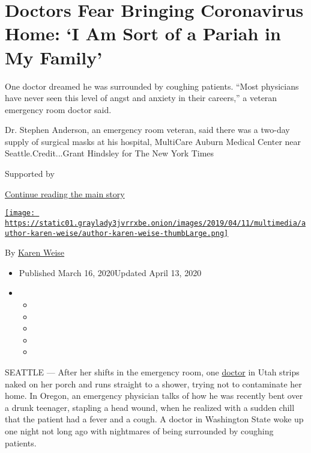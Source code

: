 \hypertarget{doctors-fear-bringing-coronavirus-home-i-am-sort-of-a-pariah-in-my-family}{%
\section{Doctors Fear Bringing Coronavirus Home: `I Am Sort of a Pariah
in My
Family'}\label{doctors-fear-bringing-coronavirus-home-i-am-sort-of-a-pariah-in-my-family}}

One doctor dreamed he was surrounded by coughing patients. ``Most
physicians have never seen this level of angst and anxiety in their
careers,'' a veteran emergency room doctor said.

Dr. Stephen Anderson, an emergency room veteran, said there was a
two-day supply of surgical masks at his hospital, MultiCare Auburn
Medical Center near Seattle.Credit...Grant Hindsley for The New York
Times

Supported by

\protect\hyperlink{after-sponsor}{Continue reading the main story}

\href{https://www.nytimes3xbfgragh.onion/by/karen-weise}{\texttt{[image: https://static01.graylady3jvrrxbe.onion/images/2019/04/11/multimedia/author-karen-weise/author-karen-weise-thumbLarge.png]}}

By \href{https://www.nytimes3xbfgragh.onion/by/karen-weise}{Karen Weise}

\begin{itemize}
\item
  Published March 16, 2020Updated April 13, 2020
\item
  \begin{itemize}
  \item
  \item
  \item
  \item
  \item
  \end{itemize}
\end{itemize}

SEATTLE --- After her shifts in the emergency room, one
\href{https://www.nytimes3xbfgragh.onion/2020/04/13/nyregion/coronavirus-nyc-doctors.html}{doctor}
in Utah strips naked on her porch and runs straight to a shower, trying
not to contaminate her home. In Oregon, an emergency physician talks of
how he was recently bent over a drunk teenager, stapling a head wound,
when he realized with a sudden chill that the patient had a fever and a
cough. A doctor in Washington State woke up one night not long ago with
nightmares of being surrounded by coughing patients.

